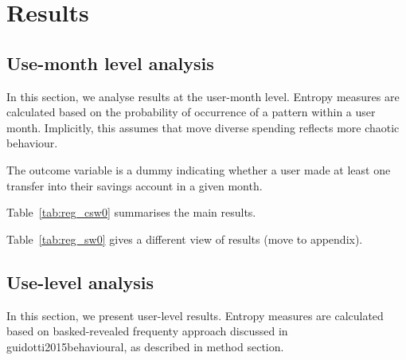 
\section{Results}%
\label{sec:results}

\subsection{Use-month level analysis}%
\label{sub:use_month_level_analysis}

In this section, we analyse results at the user-month level. Entropy measures
are calculated based on the probability of occurrence of a pattern within a
user month. Implicitly, this assumes that move diverse spending reflects more
chaotic behaviour.

The outcome variable is a dummy indicating whether a user made at least one
transfer into their savings account in a given month.

Table~\ref{tab:reg_csw0} summarises the main results.

\begin{landscape}
    
\end{landscape}

Table~\ref{tab:reg_sw0} gives a different view of results (move to appendix).

\begin{landscape}
    
\end{landscape}


\subsection{Use-level analysis}%
\label{sub:use_level_analysis}

In this section, we present user-level results. Entropy measures are calculated
based on basked-revealed frequenty approach discussed in
guidotti2015behavioural, as described in method section.

